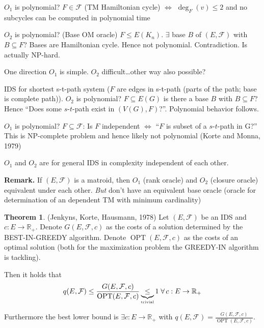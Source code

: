 \documentclass[a4paper]{article}
\theoremstyle{definition}
\newtheorem{theorem}{Theorem}
\newcommand{\gath}[2]{$#1$-$#2$-path} %
\newcommand{\fall}{\;\forall\,}
\begin{document}
$O_1$ is polynomial?
  $F \in \mathcal{F}$ (TM Hamiltonian cycle) $\Leftrightarrow$ $\deg_F(v) \leq 2$ and no subcycles can be computed in polynomial time

$O_2$ is polynomial? (Base OM oracle)
  $F \leq E(K_n)$. $\exists$ base $B$ of $(E, \mathcal{F})$ with $B \subseteq F$?
  Bases are Hamiltonian cycle. Hence not polynomial. Contradiction. Is actually NP-hard.

One direction $O_1$ is simple. $O_2$ difficult\dots other way also possible?

IDS for shortest s-t-path system ($F$ are edges in s-t-path (parts of the path; base is complete path)).
  $O_2$ is polynomial?
    $F \subseteq E(G)$ is there a base $B$ with $B \subseteq F$?
    Hence ``Does some \gath st exist in $(V(G), F)$?''.
    Polynomial behavior follows.

  $O_1$ is polynomial?
    $F \subseteq \mathcal{F}$: Is $F$ independent $\Leftrightarrow$ ``$F$ is subset of a \gath st in G?''
    This is NP-complete problem and hence likely not polynomial (Korte and Monna, 1979)

$O_1$ and $O_2$ are for general IDS in complexity independent of each other.

\textbf{Remark.}
  If $(E, \mathcal{F})$ is a matroid, then $O_1$ (rank oracle) and $O_2$ (closure oracle) equivalent under each other.
  \emph{But} don't have an equivalent base oracle (oracle for determination of an dependent TM with minimum cardinality)


\begin{theorem}
  \label{satz-8.12}
  (Jenkyns, Korte, Hausmann, 1978)
  Let $(E, \mathcal{F})$ be an IDS and $c: E \rightarrow \mathbb{R}_+$. Denote $G(E, \mathcal{F}, c)$ as the costs of a solution determined by the BEST-IN-GREEDY algorithm. Denote $\operatorname{OPT}(E, \mathcal{F}, c)$ as the costs of an optimal solution (both for the maximization problem the GREEDY-IN algorithm is tackling).

  Then it holds that
  \[
      q(E, \mathcal{F})
        \leq \frac{G(E, \mathcal{F}, c)}{\operatorname{OPT}(E, \mathcal{F}, c)}
        \underbrace{\leq}_{\text{\tiny{trivial}}} 1
        \fall c: E \rightarrow \mathbb{R}_+
  \]
\end{theorem}

Furthermore the best lower bound is $\exists c: E \rightarrow \mathbb{R}_+$ with $q(E, \mathcal{F}) = \frac{G(E, \mathcal{F}, c)}{\operatorname{OPT}(E, \mathcal{F}, c)}$.
\end{document}
